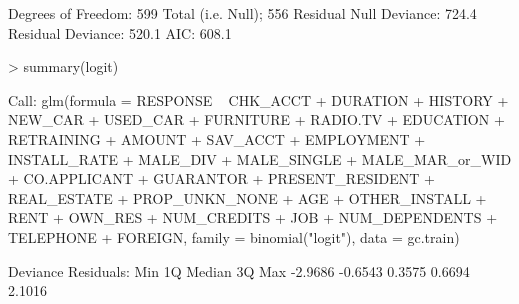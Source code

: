 \documentclass{article}
\begin{document}
\begin{Schunk}
\begin{Soutput}
Degrees of Freedom: 599 Total (i.e. Null);  556 Residual
Null Deviance:	    724.4 
Residual Deviance: 520.1 	AIC: 608.1
\end{Soutput}
\begin{Sinput}
> summary(logit)
\end{Sinput}
\begin{Soutput}
Call:
glm(formula = RESPONSE ~ CHK_ACCT + DURATION + HISTORY + NEW_CAR + 
    USED_CAR + FURNITURE + RADIO.TV + EDUCATION + RETRAINING + 
    AMOUNT + SAV_ACCT + EMPLOYMENT + INSTALL_RATE + MALE_DIV + 
    MALE_SINGLE + MALE_MAR_or_WID + CO.APPLICANT + GUARANTOR + 
    PRESENT_RESIDENT + REAL_ESTATE + PROP_UNKN_NONE + AGE + OTHER_INSTALL + 
    RENT + OWN_RES + NUM_CREDITS + JOB + NUM_DEPENDENTS + TELEPHONE + 
    FOREIGN, family = binomial("logit"), data = gc.train)

Deviance Residuals: 
    Min       1Q   Median       3Q      Max  
-2.9686  -0.6543   0.3575   0.6694   2.1016  


\end{Soutput}
\end{Schunk}
\end{document}

